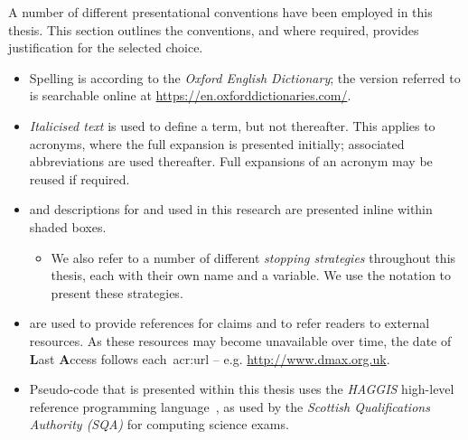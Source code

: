 
\begin{preamble}
{}

A number of different presentational conventions have been employed in this thesis. This section outlines the conventions, and where required, provides justification for the selected choice.


\begin{itemize}
    
    \item{Spelling is according to the \emph{Oxford English Dictionary}; the version referred to is searchable online at \url{https://en.oxforddictionaries.com/}.}
    
    \item{\emph{Italicised text} is used to define a term, but not thereafter. This applies to acronyms, where the full expansion is presented initially; associated abbreviations are used thereafter. Full expansions of an acronym may be reused if required.}
    
    \item{ and descriptions for  and  used in this research are presented inline within shaded boxes.}
    
    \begin{itemize}
        
        \item{We also refer to a number of different \emph{stopping strategies} throughout this thesis, each with their own name and a variable. We use the notation  to present these strategies.}
        
    \end{itemize}
    
    \item{ are used to provide references for claims and to refer readers to external resources. As these resources may become unavailable over time, the date of \textbf{L}ast \textbf{A}ccess follows each~\gls{acr:url} -- e.g. \url{http://www.dmax.org.uk}.}
    
    \item{Pseudo-code that is presented within this thesis uses the \emph{HAGGIS} high-level reference programming language~\citep{cutts2014haggis}, as used by the \emph{Scottish Qualifications Authority (SQA)} for computing science exams.}
    

\end{itemize}
\end{preamble}
